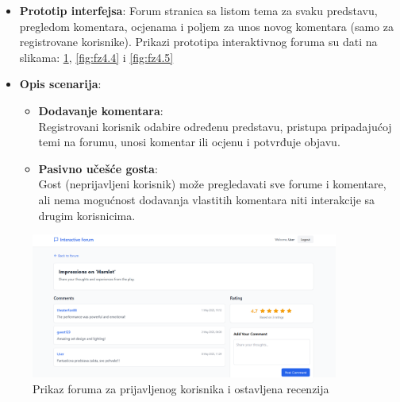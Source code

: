 \begin{itemize}
    \item \textbf{Prototip interfejsa}: Forum stranica sa listom tema za svaku predstavu, pregledom komentara, ocjenama i poljem za unos novog komentara (samo za registrovane korisnike). Prikazi prototipa interaktivnog foruma su dati na slikama: \ref{fig:fz4.3}, \ref{fig:fz4.4} i \ref{fig:fz4.5}
    \item \textbf{Opis scenarija}:
    \begin{itemize}
        \item \textbf{Dodavanje komentara}: \\
        Registrovani korisnik odabire određenu predstavu, pristupa pripadajućoj temi na forumu, unosi komentar ili ocjenu i potvrđuje objavu.
        
        \item \textbf{Pasivno učešće gosta}: \\
        Gost (neprijavljeni korisnik) može pregledavati sve forume i komentare, ali nema mogućnost dodavanja vlastitih komentara niti interakcije sa drugim korisnicima.
    \end{itemize}
\end{itemize}

\begin{figure}[H]
    \centering
    \includegraphics[width=0.9\textwidth]{Slike/fz4.3.png}
    \caption{Prikaz foruma za prijavljenog korisnika i ostavljena recenzija}
    \label{fig:fz4.3}
\end{figure}

